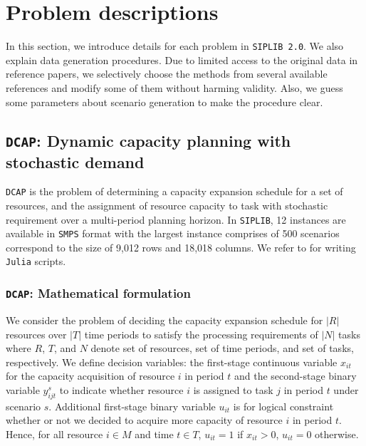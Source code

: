 \section{Problem descriptions} \label{sec:prob_desc}

In this section, we introduce details for each problem in \texttt{SIPLIB 2.0}. We also explain data generation procedures. Due to limited access to the original data in reference papers, we selectively choose the methods from several available references and modify some of them without harming validity. Also, we guess some parameters about scenario generation to make the procedure clear.  %

\subsection{\texttt{DCAP}: Dynamic capacity planning with stochastic demand}
\texttt{DCAP} is the problem of determining a capacity expansion schedule for a set of resources, and the assignment of resource capacity to task with stochastic requirement over a multi-period planning horizon. In \texttt{SIPLIB}, 12 instances are available in \texttt{SMPS} format with the largest instance comprises of 500 scenarios correspond to the size of 9,012 rows and 18,018 columns. We refer to \cite{journal:AG2004} for writing \texttt{Julia} scripts.
\subsubsection{\texttt{DCAP}: Mathematical formulation}
We consider the problem of deciding the capacity expansion schedule for $|R|$ resources over $|T|$ time periods to satisfy the processing requirements of $|N|$ tasks where $R$, $T$, and $N$ denote set of resources, set of time periods, and set of tasks, respectively. We define decision variables: the first-stage continuous variable $x_{it}$ for the capacity acquisition of resource $i$ in period $t$ and the second-stage binary variable $y_{ijt}^s$ to indicate whether resource $i$ is assigned to task $j$ in period $t$ under scenario $s$. Additional first-stage binary variable $u_{it}$ is for logical constraint whether or not we decided to acquire more capacity of resource $i$ in period $t$. Hence, for all resource $i\in M$ and time $t\in T$, $u_{it}=1$ if $x_{it}>0$, $u_{it}=0$ otherwise. 

